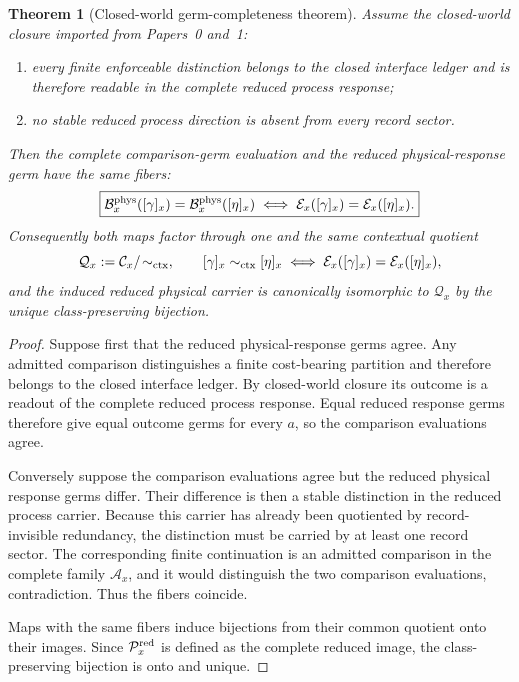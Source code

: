 \documentclass[11pt]{article}
\newtheorem{theorem}{Theorem}[section]
\theoremstyle{remark}
\begin{document}
\begin{theorem}[Closed-world germ-completeness theorem]
\label{thm:closed-world-germ-completeness}
Assume the closed-world closure imported from Papers~0 and~1:
\begin{enumerate}[label=(\roman*)]
\item every finite enforceable distinction belongs to the closed interface ledger
and is therefore readable in the complete reduced process response;
\item no stable reduced process direction is absent from every record sector.
\end{enumerate}
Then the complete comparison-germ evaluation and the reduced physical-response
germ have the same fibers:
\[
\boxed{
\mathcal B_x^{\rm phys}([\gamma]_x)
 =\mathcal B_x^{\rm phys}([\eta]_x)
\iff
\mathcal E_x([\gamma]_x)=\mathcal E_x([\eta]_x).}
\]
Consequently both maps factor through one and the same contextual quotient
\[
        \mathcal Q_x
        :=\mathcal C_x/\!\sim_{\rm ctx},
\qquad
[\gamma]_x\sim_{\rm ctx}[\eta]_x
\iff
\mathcal E_x([\gamma]_x)=\mathcal E_x([\eta]_x),
\]
and the induced reduced physical carrier is canonically isomorphic to
$\mathcal Q_x$ by the unique class-preserving bijection.
\end{theorem}

\begin{proof}
Suppose first that the reduced physical-response germs agree.  Any admitted
comparison distinguishes a finite cost-bearing partition and therefore belongs
to the closed interface ledger.  By closed-world closure its outcome is a
readout of the complete reduced process response.  Equal reduced response germs
therefore give equal outcome germs for every $a$, so the comparison evaluations
agree.

Conversely suppose the comparison evaluations agree but the reduced physical
response germs differ.  Their difference is then a stable distinction in the
reduced process carrier.  Because this carrier has already been quotiented by
record-invisible redundancy, the distinction must be carried by at least one
record sector.  The corresponding finite continuation is an admitted
comparison in the complete family $\mathcal A_x$, and it would distinguish the
two comparison evaluations, contradiction.  Thus the fibers coincide.

Maps with the same fibers induce bijections from their common quotient onto
their images.  Since $\mathcal P_x^{\rm red}$ is defined as the complete reduced
image, the class-preserving bijection is onto and unique.
\end{proof}
\end{document}
